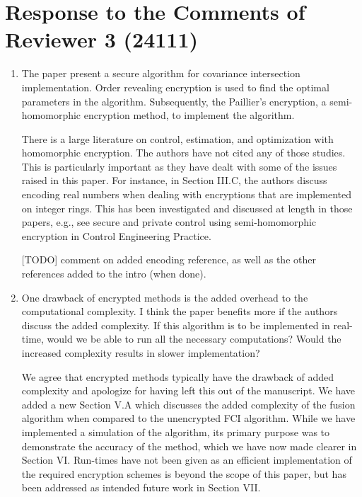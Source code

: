 \documentclass[a4paper]{scrartcl}
\newenvironment{rebuttal}{\begin{enumerate}[label={\color{grey}\thesection.\arabic{enumi}},leftmargin=0pt,ref=\thesection.\arabic{enumi}]}{\end{enumerate}}
\newcommand{\reviewtext}[1]{{\color{nblue} #1}}
\begin{document}
\section*{Response to the Comments of Reviewer 3 (24111)}
\def\thesection{R3}
\begin{rebuttal}
\item \reviewtext{The paper present a secure algorithm for covariance intersection
implementation. Order revealing encryption is used to find the optimal
parameters in the algorithm. Subsequently, the Paillier's encryption, a
semi-homomorphic encryption method, to implement the algorithm. 

There is a large literature on control, estimation, and optimization
with homomorphic encryption. The authors have not cited any of those
studies. This is particularly important as they have dealt with some of
the issues raised in this paper. For instance, in Section III.C, the
authors discuss encoding real numbers when dealing with encryptions
that are implemented on integer rings. This has been investigated and
discussed at length in those papers, e.g., see secure and private
control using semi-homomorphic encryption in Control Engineering
Practice.}

[TODO] comment on added encoding reference, as well as the other references added to the intro (when done).

\item \reviewtext{One drawback of encrypted methods is the added overhead to the
computational complexity. I think the paper benefits more if the
authors discuss the added complexity. If this algorithm is to be
implemented in real-time, would we be able to run all the necessary
computations? Would the increased complexity results in slower
implementation?}

We agree that encrypted methods typically have the drawback of added complexity and apologize for having left this out of the manuscript. We have added a new Section V.A which discusses the added complexity of the fusion algorithm when compared to the unencrypted FCI algorithm. While we have implemented a simulation of the algorithm, its primary purpose was to demonstrate the accuracy of the method, which we have now made clearer in Section VI. Run-times have not been given as an efficient implementation of the required encryption schemes is beyond the scope of this paper, but has been addressed as intended future work in Section VII.

\end{rebuttal}


\end{document}
